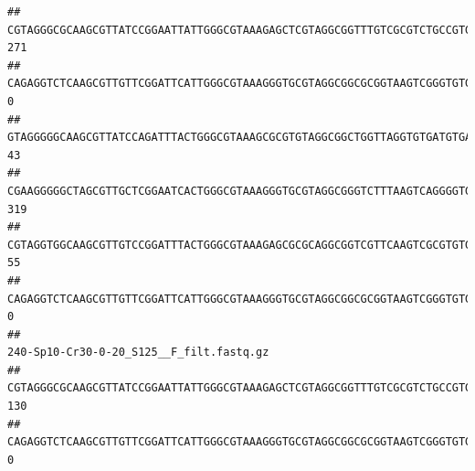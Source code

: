 \documentclass[]{article}
\begin{document}
\begin{verbatim}
## CGTAGGGCGCAAGCGTTATCCGGAATTATTGGGCGTAAAGAGCTCGTAGGCGGTTTGTCGCGTCTGCCGTGAAAGTCCGGGGCTCAACTCCGGATCTGCGGTGGGTACGGGCAGACTAGAGTGATGTAGGGGAGACTGGAATTCCTGGTGTAGCGGTGAAATGCGCAGATATCAGGAGGAACACCGATGGCGAAGGCAGGTCTCTGGGCATTAACTGACGCTGAGGAGCGAAAGCATGGGGAGCGAACA                                      271
## CAGAGGTCTCAAGCGTTGTTCGGATTCATTGGGCGTAAAGGGTGCGTAGGCGGCGCGGTAAGTCGGGTGTGAAATCTCGGAGCTTAACTCCGAAACTGCATTCGATACTGCCGTGCTTGAGGACTGGAGAGGAGACTGGAATTTACGGTGTAGCGGTGAAATGCGTAGATATCGTAAGGAAGACCAGTGGCGAAGGCGGGTCTCTGGACAGTTCCTGACGCTGAGGCACGAAGGCCAGGGGAGCAAACG                                        0
## GTAGGGGGCAAGCGTTATCCAGATTTACTGGGCGTAAAGCGCGTGTAGGCGGCTGGTTAGGTGTGATGTGAAATCTTCCGGCTCAACCGGAAAACTGCATTGCAAACCGGCCTGGCTAGAGTGCAGGAGAGGGAAGCGGAATTCCAGGTGTAGCGGTGAAATGCGTAGATATCTGGAGGAACACCAGTGGCGAAGGCGGCTTCCTGGCCTGCAACTGACGCTGAGACGCGAAAGCGTGGGGAGCGAAC                                        43
## CGAAGGGGGCTAGCGTTGCTCGGAATCACTGGGCGTAAAGGGTGCGTAGGCGGGTCTTTAAGTCAGGGGTGAAATCCTGGAGCTCAACTCCAGAACTGCCTTTGATACTGAAGATCTTGAGTTCGGGAGAGGTGAGTGGAACTGCGAGTGTAGAGGTGAAATTCGTAGATATTCGCAAGAACACCAGTGGCGAAGGCGGCTCACTGGCCCGATACTGACGCTGAGGCACGAAAGCGTGGGGAGCAAACA                                      319
## CGTAGGTGGCAAGCGTTGTCCGGATTTACTGGGCGTAAAGAGCGCGCAGGCGGTCGTTCAAGTCGCGTGTGAAAGCCCCCGGCTCAACTGGGGAGGGTCACGCGATACTGATCGACTCGAAGGCAGGAGAGGGTAGTGGAATTCCCGGTGTAGTGGTGAAATGCGTAGATATCGGGAGGAACACCAGTGGCGAAGGCGACTACCTGGCCTGTTCTTGACGCTGAGGCGCGAAAGCTAGGGGAGCAAACG                                       55
## CAGAGGTCTCAAGCGTTGTTCGGATTCATTGGGCGTAAAGGGTGCGTAGGCGGCGCGGTAAGTCGGGTGTGAAATCTCGGGGCTTAACTCCGAAACTGCATTCGATACTGCCGTGCTTGAGGACTGGAGAGGAGACTGGAATTTACGGTGTAGCGGTGAAATGCGTAGATATCGTAAGGAAGACCAGTGGCGAAGGCGGGTCTCTGGACAGTTCCTGACGCTGAGGCACGAAGGCCAGGGGAGCAAACG                                        0
##                                                                                                                                                                                                                                                           240-Sp10-Cr30-0-20_S125__F_filt.fastq.gz
## CGTAGGGCGCAAGCGTTATCCGGAATTATTGGGCGTAAAGAGCTCGTAGGCGGTTTGTCGCGTCTGCCGTGAAAGTCCGGGGCTCAACTCCGGATCTGCGGTGGGTACGGGCAGACTAGAGTGATGTAGGGGAGACTGGAATTCCTGGTGTAGCGGTGAAATGCGCAGATATCAGGAGGAACACCGATGGCGAAGGCAGGTCTCTGGGCATTAACTGACGCTGAGGAGCGAAAGCATGGGGAGCGAACA                                      130
## CAGAGGTCTCAAGCGTTGTTCGGATTCATTGGGCGTAAAGGGTGCGTAGGCGGCGCGGTAAGTCGGGTGTGAAATCTCGGAGCTTAACTCCGAAACTGCATTCGATACTGCCGTGCTTGAGGACTGGAGAGGAGACTGGAATTTACGGTGTAGCGGTGAAATGCGTAGATATCGTAAGGAAGACCAGTGGCGAAGGCGGGTCTCTGGACAGTTCCTGACGCTGAGGCACGAAGGCCAGGGGAGCAAACG                                        0

\end{verbatim}
\end{document}
